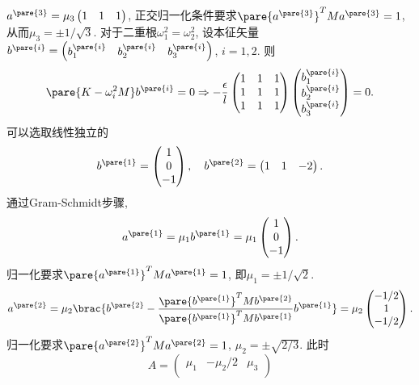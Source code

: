 \documentclass{ctexart}
\begin{document}
\begin{sample}
\begin{ex}
        $a^{\pare{3}} = \mu_3 \begin{pmatrix}
            1 & 1 & 1
        \end{pmatrix}$, 正交归一化条件要求$\pare{a^{\pare{3}}}^T Ma^{\pare{3}} = 1$, 从而$\mu_3 = \pm 1/\sqrt{3}$. 对于二重根$\omega_1^2 = \omega_2^2$, 设本征矢量$b^{\pare{i}} = \begin{pmatrix}
            b_1^{\pare{i}} & b_2^{\pare{i}} & b_3^{\pare{i}}
        \end{pmatrix}$, $i=1,2$. 则
        \[ \pare{K - \omega_i^2 M}b^{\pare{i}} = 0 \Rightarrow -\frac{\epsilon}{l}\begin{pmatrix}
            1 & 1 & 1 \\
            1 & 1 & 1 \\
            1 & 1 & 1
        \end{pmatrix}\begin{pmatrix}
            b_1^{\pare{i}} \\ b_2^{\pare{i}} \\ b_3^{\pare{i}}
        \end{pmatrix} = 0. \]
        可以选取线性独立的
        \[ b^{\pare{1}} = \begin{pmatrix}
            1 \\ 0 \\ -1
        \end{pmatrix},\quad b^{\pare{2}} = \begin{pmatrix}
            1 & 1 & -2
        \end{pmatrix}. \]
        通过Gram-Schmidt步骤,
        \[ a^{\pare{1}} = \mu_1 b^{\pare{1}} = \mu_1 \begin{pmatrix}
            1 \\ 0 \\ -1
        \end{pmatrix}. \]
        归一化要求$\pare{a^{\pare{1}}}^T M a^{\pare{1}} = 1$, 即$\mu_1 = \pm 1/\sqrt{2}$.
        \[ a^{\pare{2}} = \mu_2 \brac{b^{\pare{2}} - \frac{\pare{b^{\pare{1}}}^T M b^{\pare{2}}}{\pare{b^{\pare{1}}}^T M b^{\pare{1}}}b^{\pare{1}}} = \mu_2 \begin{pmatrix}
            -1/2 \\ 1 \\ -1/2
        \end{pmatrix}. \]
        归一化要求$\pare{a^{\pare{2}}}^T M a^{\pare{2}} = 1$, $\mu_2 = \pm \sqrt{2/3}$. 此时
        \[ A = \begin{pmatrix}
            \mu_1 & -\mu_2/2 & \mu_3 \\

\end{pmatrix}\]
\end{ex}
\end{sample}
\end{document}
